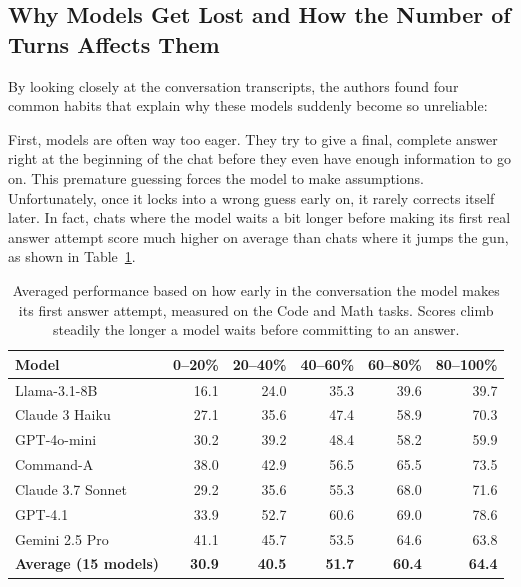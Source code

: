 \documentclass[manuscript,review]{acmart}
\begin{document}
\subsection{Why Models Get Lost and How the Number of Turns Affects Them}
\label{sec:causes}
 
By looking closely at the conversation transcripts, the authors found four common habits that explain why these models suddenly become so unreliable:

First, models are often way too eager. They try to give a final, complete answer right at the beginning of the chat before they even have enough information to go on. This premature guessing forces the model to make assumptions. Unfortunately, once it locks into a wrong guess early on, it rarely corrects itself later. In fact, chats where the model waits a bit longer before making its first real answer attempt score much higher on average than chats where it jumps the gun, as shown in Table~\ref{tab:timing}.

\begin{table}[t]
  \centering
  \caption{Averaged performance based on how early in the conversation the model makes its first answer attempt, measured on the Code and Math tasks. Scores climb steadily the longer a model waits before committing to an answer.}
  \label{tab:timing}
  \begin{tabular}{lrrrrr}
    \toprule
    \textbf{Model} & \textbf{0--20\%} & \textbf{20--40\%} & \textbf{40--60\%} & \textbf{60--80\%} & \textbf{80--100\%} \\
    \midrule
    Llama-3.1-8B  & 16.1 & 24.0 & 35.3 & 39.6 & 39.7 \\
    Claude 3 Haiku & 27.1 & 35.6 & 47.4 & 58.9 & 70.3 \\
    GPT-4o-mini    & 30.2 & 39.2 & 48.4 & 58.2 & 59.9 \\
    Command-A      & 38.0 & 42.9 & 56.5 & 65.5 & 73.5 \\
    Claude 3.7 Sonnet & 29.2 & 35.6 & 55.3 & 68.0 & 71.6 \\
    GPT-4.1        & 33.9 & 52.7 & 60.6 & 69.0 & 78.6 \\
    Gemini 2.5 Pro & 41.1 & 45.7 & 53.5 & 64.6 & 63.8 \\
    \midrule
    \textbf{Average (15 models)} & \textbf{30.9} & \textbf{40.5} & \textbf{51.7} & \textbf{60.4} & \textbf{64.4} \\
    \bottomrule
  \end{tabular}
\end{table}
\end{document}
